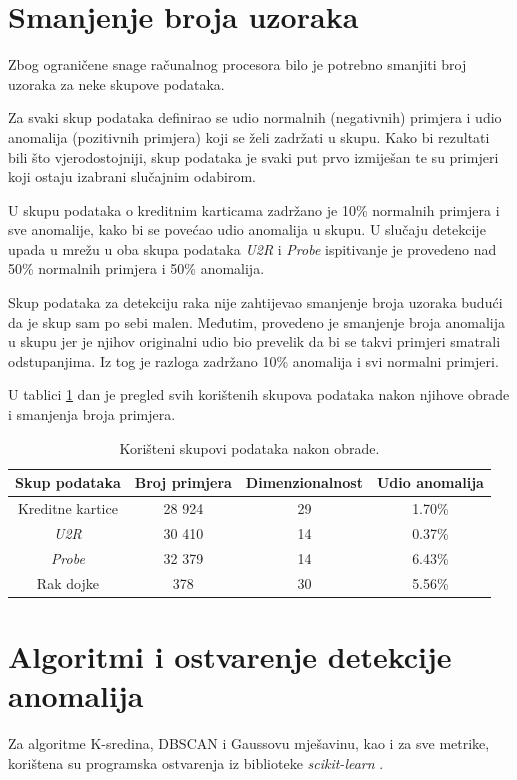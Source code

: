 \documentclass[utf8, diplomski, numeric]{fer}
\begin{document}
\section{Smanjenje broja uzoraka}
Zbog ograničene snage računalnog procesora bilo je potrebno smanjiti broj uzoraka za neke skupove podataka. 

Za svaki skup podataka definirao se udio normalnih (negativnih) primjera i udio anomalija (pozitivnih primjera) koji se želi zadržati u skupu. Kako bi rezultati bili što vjerodostojniji, skup podataka je svaki put prvo izmiješan te su primjeri koji ostaju izabrani slučajnim odabirom. 

U skupu podataka o kreditnim karticama zadržano je 10\% normalnih primjera i sve anomalije, kako bi se povećao udio anomalija u skupu. U slučaju detekcije upada u mrežu u oba skupa podataka \textit{U2R} i \textit{Probe} ispitivanje je provedeno nad 50\% normalnih primjera i 50\% anomalija.

Skup podataka za detekciju raka nije zahtijevao smanjenje broja uzoraka budući da je skup sam po sebi malen. Međutim, provedeno je smanjenje broja anomalija u skupu jer je njihov originalni udio bio prevelik da bi se takvi primjeri smatrali odstupanjima. Iz tog je razloga zadržano 10\% anomalija i svi normalni primjeri.

U tablici \ref{tab:datasets2} dan je pregled svih korištenih skupova podataka nakon njihove obrade i smanjenja broja primjera.

\begin{table}[h!]
  \begin{center}
    \caption{Korišteni skupovi podataka nakon obrade.}
    \label{tab:datasets2}
    \begin{tabular}{c|c|c|c} 
      \textbf{Skup podataka} & \textbf{Broj primjera} & \textbf{Dimenzionalnost}  & \textbf{Udio anomalija}\\
      \hline
      Kreditne kartice & 28 924 & 29 & 1.70\% \\
      \textit{U2R} & 30 410 & 14 & 0.37\% \\
      \textit{Probe} & 32 379 & 14 & 6.43\% \\
      Rak dojke & 378 & 30 & 5.56\% \\
     \end{tabular}
  \end{center}
\end{table}

\section{Algoritmi i ostvarenje detekcije anomalija}
Za algoritme K-sredina, DBSCAN i Gaussovu mješavinu, kao i za sve metrike, korištena su programska ostvarenja iz biblioteke \textit{scikit-learn} \cite{scikit-learn}.
\end{document}
